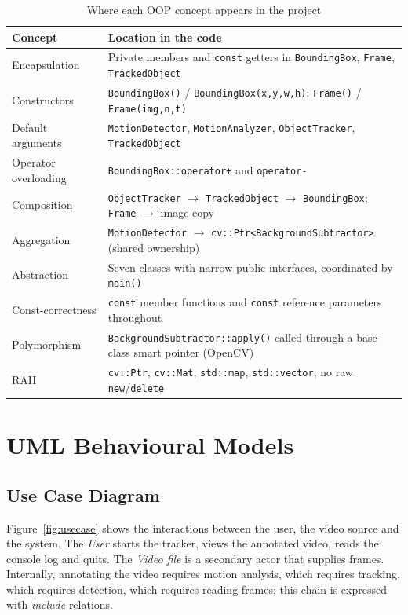 \documentclass[12pt,a4paper,oneside]{book}
\begin{document}
\begin{table}[H]
\centering
\caption{Where each OOP concept appears in the project}
\label{tab:oop-map}
\footnotesize
\begin{tabular}{@{}p{3.5cm}p{11.4cm}@{}}
\toprule
\textbf{Concept} & \textbf{Location in the code}\\
\midrule
Encapsulation & Private members and \texttt{const} getters in \texttt{BoundingBox}, \texttt{Frame}, \texttt{TrackedObject}\\
Constructors & \texttt{BoundingBox()} / \texttt{BoundingBox(x,y,w,h)}; \texttt{Frame()} / \texttt{Frame(img,n,t)}\\
Default arguments & \texttt{MotionDetector}, \texttt{MotionAnalyzer}, \texttt{ObjectTracker}, \texttt{TrackedObject}\\
Operator overloading & \texttt{BoundingBox::operator+} and \texttt{operator-}\\
Composition & \texttt{ObjectTracker} $\rightarrow$ \texttt{TrackedObject} $\rightarrow$ \texttt{BoundingBox}; \texttt{Frame} $\rightarrow$ image copy\\
Aggregation & \texttt{MotionDetector} $\rightarrow$ \texttt{cv::Ptr<BackgroundSubtractor>} (shared ownership)\\
Abstraction & Seven classes with narrow public interfaces, coordinated by \texttt{main()}\\
Const-correctness & \texttt{const} member functions and \texttt{const} reference parameters throughout\\
Polymorphism & \texttt{BackgroundSubtractor::apply()} called through a base-class smart pointer (OpenCV)\\
RAII & \texttt{cv::Ptr}, \texttt{cv::Mat}, \texttt{std::map}, \texttt{std::vector}; no raw \texttt{new}/\texttt{delete}\\
\bottomrule
\end{tabular}
\end{table}

\section{UML Behavioural Models}

\subsection{Use Case Diagram}
Figure~\ref{fig:usecase} shows the interactions between the user, the video source and the system. The \emph{User} starts the tracker, views the annotated video, reads the console log and quits. The \emph{Video file} is a secondary actor that supplies frames. Internally, annotating the video requires motion analysis, which requires tracking, which requires detection, which requires reading frames; this chain is expressed with \emph{include} relations.
\end{document}
